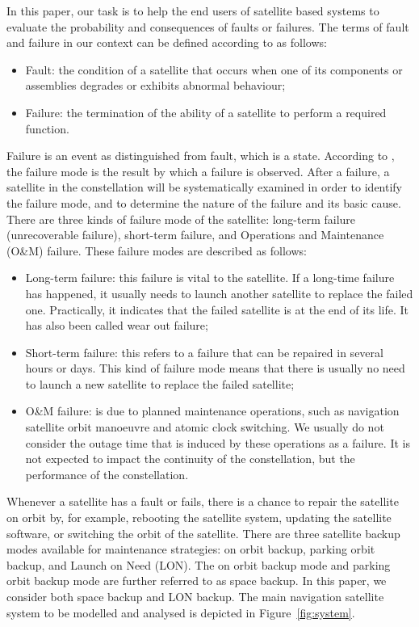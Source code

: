 \documentclass[preprint,12pt]{qrei}
\begin{document}
In this paper, our task is to help the end users of satellite based systems to evaluate the probability and consequences of faults or failures. The terms of fault and failure in our context can be defined according to \cite{Czi13} as follows:

\begin{itemize}
\item Fault: the condition of a satellite that occurs when one of its components or assemblies degrades or exhibits abnormal behaviour;
\item Failure: the termination of the ability of a satellite to perform a required function.
\end{itemize}

Failure is an event as distinguished from fault, which is a state. According to \cite{Czi13}, the failure mode is the result by which a failure is observed. After a failure, a satellite in the constellation will be systematically examined in order to identify the failure mode, and to determine the nature of the failure and its basic cause. There are three kinds of failure mode of the satellite: long-term failure (unrecoverable failure), short-term failure, and Operations and Maintenance (O\&M) failure. These failure modes are described as follows:

\begin{itemize} 
\item Long-term failure: this failure is vital to the satellite. If a long-time failure has happened, it usually needs to launch another satellite to replace the failed one. Practically, it indicates that the failed satellite is at the end of its life. It has also been called wear out failure;
\item Short-term failure: this refers to a failure that can be repaired in several hours or days. This kind of failure mode means that there is usually no need to launch a new satellite to replace the failed satellite;
\item O\&M failure: is due to planned maintenance operations, such as navigation satellite orbit manoeuvre and atomic clock switching. We usually do not consider the outage time that is induced by these operations as a failure. It is not expected to impact the continuity of the constellation, but the performance of the constellation.
\end{itemize}

Whenever a satellite has a fault or fails, there is a chance to repair the satellite on orbit by, for example, rebooting the satellite system, updating the satellite software, or switching the orbit of the satellite. There are three satellite backup modes available for maintenance strategies: on orbit backup, parking orbit backup, and Launch on Need (LON). The on orbit backup mode and parking orbit backup mode are further referred to as space backup. In this paper, we consider both space backup and LON backup. The main navigation satellite system to be modelled and analysed is depicted in Figure~\ref{fig:system}.
\end{document}
